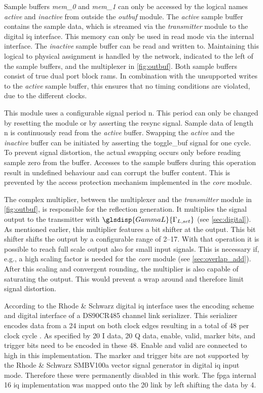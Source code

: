 \documentclass[12pt,a4paper,parskip=full,abstract=true,BCOR=12mm,twoside,open=right]{scrreprt}
\def\device#1{\mbox{\textit{#1}}}
\begin{document}
Sample buffers \device{mem\_0} and \device{mem\_1} can only be accessed by the
logical names \device{active} and \device{inactive} from outside the
\device{outbuf} module. The \device{active} sample buffer contains the sample data,
which is streamed via the \device{transmitter} module to the digital \gls{iq}
interface. This memory can only be used in read mode via the internal interface.
The \device{inactive} sample buffer can be read and written to. Maintaining this
logical to physical assignment is handled by the network, indicated to the left
of the sample buffers, and the multiplexer in \cref{fig:outbuf}. Both sample
buffers consist of true dual port block \glspl{ram}. In combination with the
unsupported writes to the \device{active} sample buffer, this ensures that
no timing conditions are violated, due to the different clocks.

This module uses a configurable signal period \gls{n}. This period can only be changed
by resetting the module or by asserting the resync signal. Sample data of length \gls{n} is
continuously read from the \device{active} buffer. Swapping the \device{active}
and the \device{inactive} buffer can be initiated by asserting the toggle\_buf
signal for one cycle. To prevent signal distortion, the actual swapping occurs
only before reading sample zero from the buffer. Accesses to the sample buffers
during this operation result in undefined behaviour and can corrupt the buffer
content. This is prevented by the access protection mechanism implemented
in the \device{core} module.

The complex multiplier, between the multiplexer and the \device{transmitter}
module in \cref{fig:outbuf}, is responsible for the
reflection generation. It multiplies the signal output to the transmitter
with $\glsdisp{GammaL}{\Gamma_{L,set}}$ (see \cref{sec:digital}). As mentioned earlier, this
multiplier features a bit shifter at the output. This bit shifter shifts the
output by a configurable range of \SIrange{2}{17}{\bit}. With that operation
it is possible to reach full scale output also for small input
signals. This is necessary if, e.g., a high scaling factor is needed
for the \device{core} module (see \cref{sec:overlap_add}). After this scaling
and convergent rounding, the multiplier is also capable of saturating the
output. This would prevent a wrap around and therefore limit signal distortion.

According to \cite{fsq_b17} the Rhode \& Schwarz digital \gls{iq} interface
uses the encoding scheme and digital interface of a DS90CR485 channel link
serializer. This serializer encodes data from a \SI{24}{\bit} input on both
clock edges resulting in a total of \SI{48}{\bit} per clock cycle \cite{ds90cr485}.
As specified by \cite{fsq_b17} \SI{20}{\bit} I data, \SI{20}{\bit} Q data, enable,
valid, marker bits, and trigger bits need to be encoded in these \SI{48}{\bit}. Enable
and valid are connected to high in this implementation. The marker and trigger
bits are not supported by the Rhode \& Schwarz SMBV100a vector signal generator
in digital \gls{iq} input mode. Therefore these were permanently disabled in this
work. The \gls{fpga} internal \SI{16}{\bit} \gls{iq} implementation was mapped
onto the \SI{20}{\bit} link by left shifting the data by \SI{4}{\bit}.
\end{document}
